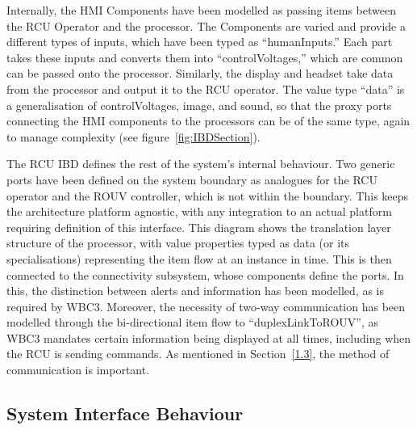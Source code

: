 \documentclass[../main.tex]{subfiles}
\begin{document}
Internally, the HMI Components have been modelled as passing items between the RCU Operator and the processor.
The Components are varied and provide a different types of inputs, which have been typed as ``humanInputs.''
Each part takes these inputs and converts them into ``controlVoltages,'' which are common can be passed onto the processor.
Similarly, the display and headset take data from the processor and output it to the RCU operator.
The value type ``data'' is a generalisation of controlVoltages, image, and sound, so that the proxy ports connecting the HMI components to the processors can be of the same type, again to manage complexity (see figure~\ref{fig:IBDSection}).

The RCU IBD defines the rest of the system's internal behaviour.
Two generic ports have been defined on the system boundary as analogues for the RCU operator and the ROUV controller, which is not within the boundary.
This keeps the architecture platform agnostic, with any integration to an actual platform requiring definition of this interface.
This diagram shows the translation layer structure of the processor, with value properties typed as data (or its specialisations) representing the item flow at an instance in time.
This is then connected to the connectivity subsystem, whose components define the ports.
In this, the distinction between alerts and information has been modelled, as is required by WBC3\cite{WBC3}.
Moreover, the necessity of two-way communication has been modelled through the bi-directional item flow to ``duplexLinkToROUV'', as WBC3 mandates certain information being displayed at all times, including when the RCU is sending commands.
As mentioned in Section~\ref{1.3}, the method of communication is important.


\subsection{System Interface Behaviour}\label{2.4}
\end{document}
